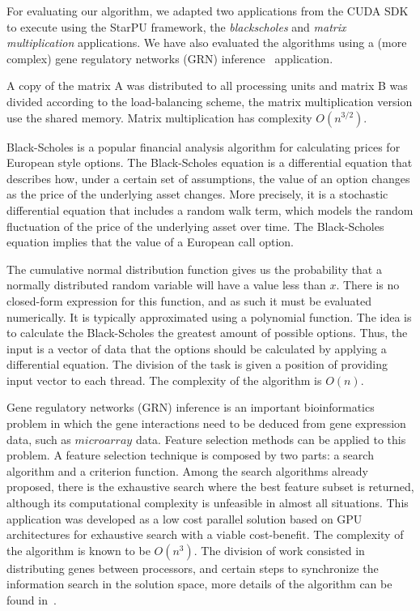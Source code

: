 \documentclass[journal]{IEEEtran}
\begin{document}
For evaluating our algorithm, we adapted two applications from the CUDA
SDK~\cite{cuda} to execute using the StarPU framework, the \emph{blackscholes} and \emph{matrix
multiplication} applications. We have also evaluated the algorithms using a (more complex) gene regulatory networks (GRN) inference~\cite{borelli2013gene} application.

 A copy of the matrix A was distributed to all processing units and matrix B was divided according to
the load-balancing scheme, the matrix multiplication version use the shared memory. Matrix multiplication has complexity $O(n^{3/2})$.

Black-Scholes is a popular financial analysis algorithm for calculating prices
for European style options. The Black-Scholes equation is a differential
equation that describes how, under a certain set of assumptions, the value of an
option changes as the price of the underlying asset changes. More precisely, it
is a stochastic differential equation that includes a random walk term, which
models the random fluctuation of the price of the underlying asset over time.
The Black-Scholes equation implies that the value of a European call option.


The cumulative normal distribution function gives us the probability that a
normally distributed random variable will have a value less than $x$. There is no
closed-form expression for this function, and as such it must be evaluated
numerically. It is typically approximated using a polynomial function. The idea is to calculate the Black-Scholes the greatest amount of possible options. Thus, the input is a vector of data that the options should be calculated by applying a differential equation. The division of the task is given a position of providing input vector to each thread. The complexity of the algorithm is $O(n)$.


Gene regulatory networks (GRN) inference is an important bioinformatics problem in which the gene interactions need to be deduced from gene expression data, such as $microarray$ data. Feature selection methods can be applied to this problem. A feature selection technique is composed by two parts: a search algorithm and a criterion function. Among the search algorithms already proposed, there is the exhaustive search where the best
feature subset is returned, although its computational complexity is unfeasible in almost all situations. This application was developed as a low cost parallel solution based on GPU architectures for exhaustive search with a viable cost-benefit. The complexity of the algorithm is known to be $O(n^3)$. The division of work consisted in distributing genes between processors, and certain steps to synchronize the information search in the solution space, more details of the algorithm can be found in~\cite{borelli2013gene}.
\end{document}

